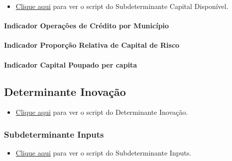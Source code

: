 \documentclass[
  12,
  dvipsnames]{article}
\providecommand{\tightlist}{%
  \setlength{\itemsep}{0pt}\setlength{\parskip}{0pt}}
\begin{document}
\begin{itemize}
\tightlist
\item
  \protect\hyperlink{script_2.4.1}{Clique aqui} para ver o script do
  Subdeterminante Capital Disponível.
\end{itemize}

\hypertarget{indicador-operauxe7uxf5es-de-cruxe9dito-por-municuxedpio}{%
\paragraph{Indicador Operações de Crédito por
Município}\label{indicador-operauxe7uxf5es-de-cruxe9dito-por-municuxedpio}}

\hypertarget{indicador-proporuxe7uxe3o-relativa-de-capital-de-risco}{%
\paragraph{Indicador Proporção Relativa de Capital de
Risco}\label{indicador-proporuxe7uxe3o-relativa-de-capital-de-risco}}

\hypertarget{indicador-capital-poupado-per-capita}{%
\paragraph{Indicador Capital Poupado per
capita}\label{indicador-capital-poupado-per-capita}}

\hypertarget{det_inovacao}{%
\subsection{Determinante Inovação}\label{det_inovacao}}

\begin{itemize}
\tightlist
\item
  \protect\hyperlink{script_2.5}{Clique aqui} para ver o script do
  Determinante Inovação.
\end{itemize}

\hypertarget{subdet_input}{%
\subsubsection{Subdeterminante Inputs}\label{subdet_input}}

\begin{itemize}
\tightlist
\item
  \protect\hyperlink{script_2.5.1}{Clique aqui} para ver o script do
  Subdeterminante Inputs.
\end{itemize}
\end{document}
